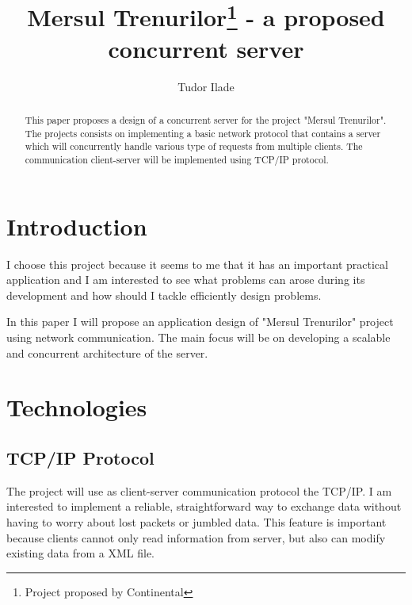 \documentclass[runningheads]{llncs}
\begin{document}
%
\title{Mersul Trenurilor\thanks{Project proposed by Continental} - a proposed concurrent server}
%
%
\author{Tudor Ilade}
%
%
%
\maketitle              %
%
\begin{abstract}
This paper proposes a design of a concurrent server for the project "Mersul Trenurilor". The projects consists on implementing a basic network protocol that contains a server which will concurrently handle various type of requests from multiple clients. The communication client-server will be implemented using TCP/IP protocol.

\end{abstract}
%
%
%
\section{Introduction}
I choose this project because it seems to me that it has an important practical application and I am interested to see what problems can arose during its development and how should I tackle efficiently design problems.

In this paper I will propose an application design of "Mersul Trenurilor" project using network communication. The main focus will be on developing a scalable and concurrent architecture of the server. 

\section{Technologies}
\subsection{TCP/IP Protocol}
The project will use as client-server communication protocol the TCP/IP. I am interested to implement a reliable, straightforward way to exchange data without having to worry about lost packets or jumbled data. This feature is important because clients cannot only read information from server, but also can modify existing data from a XML file.
\end{document}
